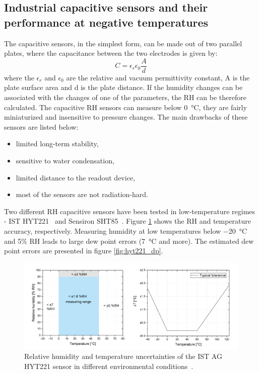 \subsection{Industrial capacitive sensors and their performance at negative temperatures}
\label{capacitive_sensors}
The capacitive sensors, in the simplest form, can be made out of two parallel plates, where the capacitance between the two electrodes is given by:
\begin{equation}
C = \epsilon_{r}\epsilon_0\frac{A}{d}
\end{equation}
where the $\epsilon_{r}$ and $\epsilon_{0}$ are the relative and vacuum permittivity constant, A is the plate surface area and d is the plate distance. If the humidity changes can be associated with the changes of one of the parameters, the \gls{RH} can be therefore calculated. 
The capacitive \gls{RH} sensors can measure below \SI{0}{\celsius}, they are fairly miniaturized and insensitive to pressure changes. The main drawbacks of these sensors are listed below:
\begin{itemize}
    \item limited long-term stability,
    \item sensitive to water condensation,
    \item limited distance to the readout device,
    \item most of the sensors are not radiation-hard.
\end{itemize}
Two different \gls{RH} capacitive sensors have been tested in low-temperature regimes - IST HYT221~\cite{hyt221} and Sensiron SHT85~\cite{SHT85}. Figure \ref{fig:hyt221} shows the \gls{RH} and temperature accuracy, respectively. Measuring humidity at low temperatures below \SI{-20}{\celsius} and 5\% \gls{RH} leads to large dew point errors (\SI{7}{\celsius} and more). The estimated dew point errors are presented in figure \ref{fig:hyt221_dp}.
\begin{figure}[!h]
\centering
\includegraphics[width=0.9\columnwidth]{Chapter5/images/hyt221_rh.png}
\caption{Relative humidity and temperature uncertainties of the IST AG HYT221 sensor in different environmental conditions~\cite{hyt221}.}
\label{fig:hyt221}
\end{figure}
